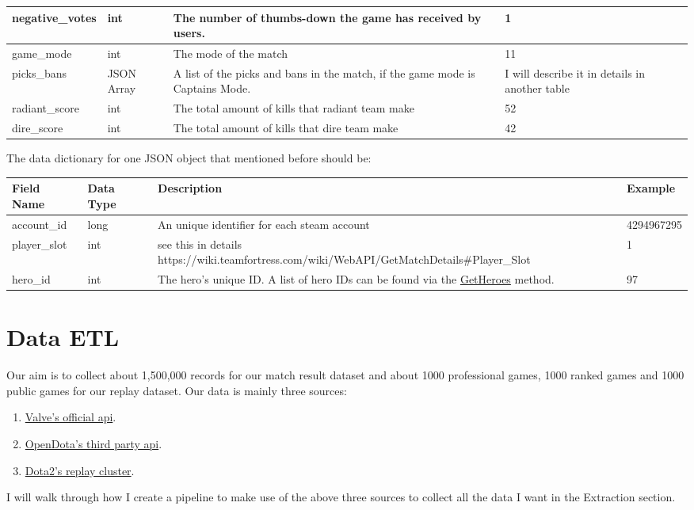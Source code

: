 \documentclass{article}
\begin{document}
\begin{tabular}{|p{3cm}|p{2cm}|p{5cm}|p{3cm}|}
\hline
negative\_votes & int & The number of thumbs-down the game has received by users. & 1 \\
\hline
game\_mode & int & The mode of the match & 11 \\
\hline
picks\_bans & JSON Array & A list of the picks and bans in the match, if the game mode is Captains Mode. & I will describe it in details in another table \\
\hline
radiant\_score & int & The total amount of kills that radiant team make & 52 \\
\hline
dire\_score & int & The total amount of kills that dire team make & 42 \\
\hline
\end{tabular}

The data dictionary for one JSON object that mentioned before should be: \\
\begin{tabular}{|p{3cm}|p{2cm}|p{5cm}|p{3cm}|}
\hline
Field Name& Data Type& Description & Example\\
\hline
account\_id & long & An unique identifier for each steam account & 4294967295 \\
\hline
player\_slot & int & see this in details https://wiki.teamfortress.com/wiki/WebAPI/GetMatchDetails\#Player\_Slot & 1 \\
\hline
hero\_id & int & The hero's unique ID. A list of hero IDs can be found via the \href{https://wiki.teamfortress.com/wiki/WebAPI/GetHeroes}{GetHeroes} method. & 97 \\

\hline
\end{tabular}
\section{Data ETL}
Our aim is to collect about 1,500,000 records for our match result dataset and about 1000 professional games, 1000 ranked games and 1000 public games for our replay dataset. Our data is mainly three sources:
\begin{enumerate}
\item \href{https://wiki.teamfortress.com/wiki/WebAPI/}{Valve's official api}.
\item \href{https://docs.opendota.com/}{OpenDota's third party api}.
\item \href{https://dev.dota2.com/showthread.php?t=47115}{Dota2's replay cluster}.
\end{enumerate}
    I will walk through how I create a pipeline to make use of the above three sources to collect all the data I want in the Extraction section. \\
\end{document}
